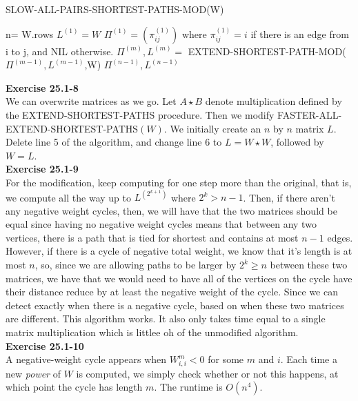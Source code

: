 \documentclass{article}
\begin{document}
\begin{algorithm}
\caption{SLOW-ALL-PAIRS-SHORTEST-PATHS-MOD(W)}
\begin{algorithmic}
\State n= W.rows
\State $L^{(1)} = W$
\State $\Pi^{(1)} = (\pi_{ij}^{(1)})$ where $\pi_{ij}^{(1)} = i$ if there is an edge from i to j, and NIL otherwise. 
\State $\Pi^{(m)},L^{(m)} = $ EXTEND-SHORTEST-PATH-MOD($\Pi^{(m-1)},L^{(m-1)}$,W)
\EndFor
\State \Return $\Pi^{(n-1)},L^{(n-1)}$
\end{algorithmic}
\end{algorithm}



\noindent\textbf{Exercise 25.1-8}\\

We can overwrite matrices as we go.  Let $A \star B$ denote multiplication defined by the EXTEND-SHORTEST-PATHS procedure.  Then we modify FASTER-ALL-EXTEND-SHORTEST-PATHS$(W)$.  We initially create an $n$ by $n$ matrix $L$.  Delete line 5 of the algorithm, and change line 6 to $L = W \star W$, followed by $W = L$.\\ 

\noindent\textbf{Exercise 25.1-9}\\

For the modification, keep computing for one step more than the original, that is, we compute all the way up to $L^{(2^{k+1})}$ where $2^{k} >n-1$. Then, if there aren't any negative weight cycles, then, we will have that the two matrices should be equal since having no negative weight cycles means that between any two vertices, there is a path that is tied for shortest and contains at most $n-1$ edges. However, if there is a cycle of negative total weight, we know that it's length is at most $n$, so, since we are allowing paths to be larger by $2^k\ge n$ between these two matrices, we have that we would need to have all of the vertices on the cycle have their distance reduce by at least the negative weight of the cycle. Since we can detect exactly when there is a negative cycle, based on when these two matrices are different. This algorithm works. It also only takes time equal to a single matrix multiplication which is littlee oh of the unmodified algorithm.\\

\noindent\textbf{Exercise 25.1-10}\\

A negative-weight cycle appears when $W^m_{i,i} < 0$ for some $m$ and $i$.  Each time a new \emph{power} of $W$ is computed, we simply check whether or not this happens, at which point the cycle has length $m$.  The runtime is $O(n^4)$. \\
\end{document}
